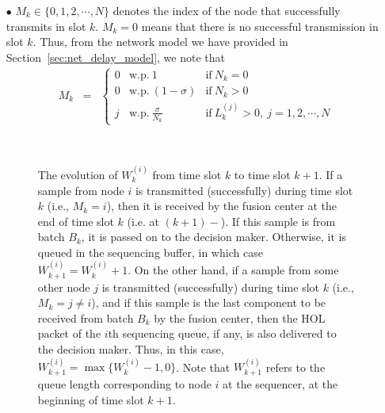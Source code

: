 \documentclass[acmtosn]{acmtrans2m}
\begin{document}
\begin{itemize}
\item[$\bullet$] $M_k \in \{0,1,2,\cdots,N\}$ denotes the index of the node
     that successfully transmits in slot $k$. $M_k=0$ means that there
     is no successful transmission in slot $k$. Thus,
     from the network model we have provided in Section~\ref{sec:net_delay_model},
     we note that
     \begin{eqnarray*}
     M_{k} & = & \left\{
                         \begin{array}{lll} 
                         0 & \mathrm{w.p.} \ 1                  & \text{if} \ N_k = 0\\  
                         0 & \mathrm{w.p.} \ (1-\sigma)         & \text{if} \ N_k > 0\\  
                         j & \mathrm{w.p.} \ \frac{\sigma}{N_k} & \text{if} \ L_k^{(j)} > 0, \ j=1,2,\cdots,N
                         \end{array}
     \right. 
     \end{eqnarray*}
      
\begin{figure}[t]
   \centering \
   \caption{The evolution of $W_k^{(i)}$ from time slot $k$ to time slot $k+1$. 
            If a sample from node $i$ is transmitted (successfully) during time 
            slot $k$ (i.e., $M_k = i$), then it is received by the fusion center 
            at the end of time slot $k$ (i.e. at $(k+1)-$). If this sample is from
            batch $B_k$, it is passed on to the decision maker. Otherwise, it is 
            queued in the sequencing buffer, in which case $W_{k+1}^{(i)} = W_k^{(i)} + 1$. 
            On the other hand, if a sample from some other node $j$ is transmitted 
            (successfully) during time slot $k$ (i.e., $M_k = j\neq i$), and if this 
            sample is the last component to be received from batch $B_k$ by the fusion 
            center, then the HOL packet of the $i$th sequencing queue, if any, is also 
            delivered to the decision maker. Thus, in this case, 
            $W_{k+1}^{(i)} = \max\{W_k^{(i)} - 1,0\}$. Note that $W_{k+1}^{(i)}$ refers 
            to the queue length corresponding to node $i$ at the sequencer, at the 
            beginning of time slot $k+1$.}
   \label{fig:na_processing_embedding_fc_side}
\end{figure}


\end{itemize}
\end{document}
